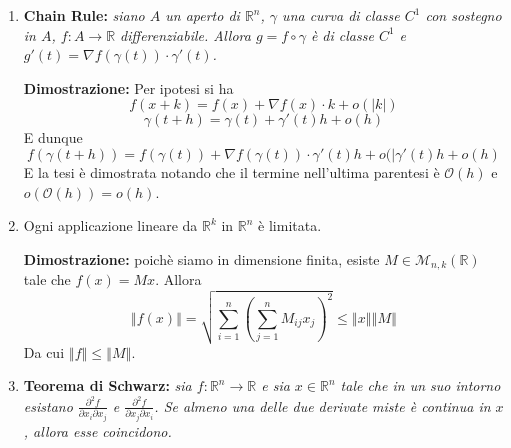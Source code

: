 \documentclass[a4paper,11pt]{article}
\newcommand{\norm}[1]{\left\Vert#1\right\Vert}
\begin{document}
\begin{enumerate}
	\item \textbf{Chain Rule:} \textit{siano $A$ un aperto di $\mathbb{R}^n$, $\gamma$ una curva di classe $C^1$ con sostegno in $A$, $f\colon A\to\mathbb{R}$ differenziabile. Allora $g=f\circ\gamma$ è di classe $C^1$ e $g'(t)=\nabla f(\gamma(t))\cdot\gamma'(t)$.}
	
	\textbf{Dimostrazione:} Per ipotesi si ha
	\[f(x+k)=f(x)+\nabla f(x)\cdot k+o(|k|)\]
	\[\gamma(t+h)=\gamma(t)+\gamma'(t)h+o(h)\]
	E dunque
	\[f(\gamma(t+h))=f(\gamma(t))+\nabla f(\gamma(t))\cdot\gamma'(t)h+o(|\gamma'(t)h+o(h)\]
	E la tesi è dimostrata notando che il termine nell'ultima parentesi è $\mathcal{O}(h)$ e $o(\mathcal{O}(h))=o(h)$.
	
	\item Ogni applicazione lineare da $\mathbb{R}^k$ in $\mathbb{R}^n$ è limitata.
	
	\textbf{Dimostrazione:} poichè siamo in dimensione finita, esiste $M\in\mathcal{M}_{n,k}(\mathbb{R})$ tale che $f(x)=Mx$. Allora
	\[\norm{f(x)}=\sqrt{\sum_{i=1}^{n}\left(\sum_{j=1}^{n}M_{ij}x_j\right)^2}\leq\norm{x}\norm{M}\]
	Da cui $\norm{f}\leq\norm{M}$.
	\item \textbf{Teorema di Schwarz:} \textit{sia $f\colon\mathbb{R}^n\to\mathbb{R}$ e sia $x\in\mathbb{R}^n$ tale che in un suo intorno esistano $\frac{\partial^2f}{\partial x_i\partial x_j}$ e $\frac{\partial^2f}{\partial x_j\partial x_i}$. Se almeno una delle due derivate miste è continua in $x$, allora esse coincidono.}
	

\end{enumerate}
\end{document}
